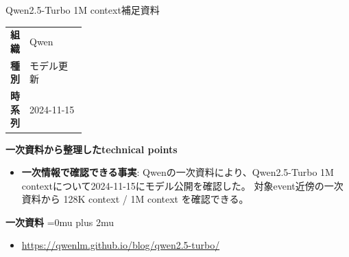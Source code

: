 \begin{technicalnote}{Qwen2.5-Turbo 1M context}{補足資料}
\begingroup
\begin{tabularx}{\linewidth}{@{}>{\bfseries}p{0.22\linewidth}X@{}}
組織 & Qwen \\
種別 & モデル更新 \\
時系列 & 2024-11-15 \\
\end{tabularx}
\smallskip
{\bfseries 一次資料から整理したtechnical points}
\begin{itemize}[leftmargin=1.5em,itemsep=0.35em]
\item \textbf{一次情報で確認できる事実}: Qwenの一次資料により、Qwen2.5-Turbo 1M contextについて2024-11-15にモデル公開を確認した。 対象event近傍の一次資料から 128K context / 1M context を確認できる。
\end{itemize}
\begin{minipage}{\linewidth}
\begin{samepage}
{\bfseries 一次資料}
\begingroup\sloppy
\Urlmuskip=0mu plus 2mu\relax
\begin{itemize}[leftmargin=1.5em,itemsep=0.25em]
\item {\scriptsize\url{https://qwenlm.github.io/blog/qwen2.5-turbo/}}
\end{itemize}
\endgroup
\end{samepage}
\end{minipage}
\endgroup
\end{technicalnote}
\medskip

